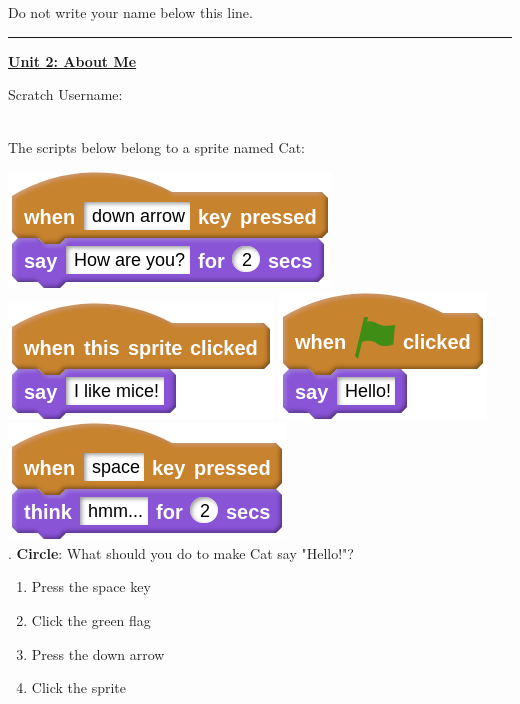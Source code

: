\documentclass[letterpaper,12pt]{article}
\begin{document}
\noindent Do not write your name below this line. \\
\noindent \hrule
\begin{center}
{\Large \textbf{\underline{Unit 2: About Me}}}
\end{center}
Scratch Username:

\noindent \dotfill \\

\noindent The scripts below belong to a sprite named Cat:

\includegraphics[scale=.7]{q1_script0.png} \hspace{1cm}
\includegraphics[scale=.7]{q1_script1.png} \hspace{1cm}
\includegraphics[scale=.7]{q1_script2.png} \hspace{1cm}
\includegraphics[scale=.7]{q1_script3.png} \\


. \textbf{Circle}: What should you do to make Cat say "Hello!"?
\renewcommand{\theenumi}{\Alph{enumi}}
\begin{enumerate}
\item Press the space key
\item Click the green flag
\item Press the down arrow
\item Click the sprite
\end{enumerate}
\end{document}
